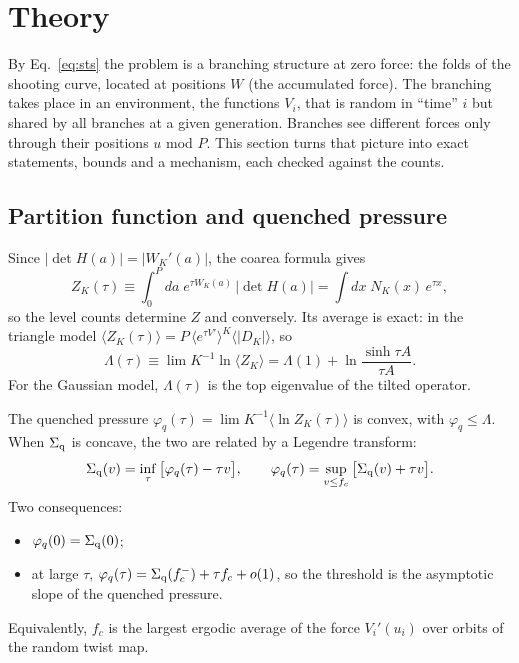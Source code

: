 \documentclass[10pt,a4paper]{article}
\newcommand{\Sq}{\Sigma_{\rm q}}
\begin{document}
\section{Theory}\label{sec:theory}

By Eq.~\eqref{eq:sts} the problem is a branching structure at zero force: the folds of the shooting curve, located at positions $W$ (the accumulated force).
The branching takes place in an environment, the functions $V_i$, that is random in ``time'' $i$ but shared by all branches at a given generation.
Branches see different forces only through their positions $u$ mod $P$.
This section turns that picture into exact statements, bounds and a mechanism, each checked against the counts.

\subsection{Partition function and quenched pressure}

Since $|\det H(a)|=|W_K'(a)|$, the coarea formula gives
\begin{equation}
Z_K(\tau)\equiv\int_0^P\!da\;e^{\tau W_K(a)}\,|\det H(a)|=\int\!dx\;N_K(x)\,e^{\tau x},
\label{eq:Z}
\end{equation}
so the level counts determine $Z$ and conversely.
Its average is exact: in the triangle model $\langle Z_K(\tau)\rangle=P\,\langle e^{\tau V'}\rangle^K\langle|D_K|\rangle$, so
\[
\Lambda(\tau)\equiv\lim K^{-1}\ln\langle Z_K\rangle=\Lambda(1)+\ln\frac{\sinh\tau A}{\tau A}.
\]
For the Gaussian model, $\Lambda(\tau)$ is the top eigenvalue of the tilted operator.

The quenched pressure $\varphi_q(\tau)=\lim K^{-1}\langle\ln Z_K(\tau)\rangle$ is convex, with $\varphi_q\le\Lambda$.
When $\Sq$ is concave, the two are related by a Legendre transform:
\begin{equation}
\Sq(v)=\inf_\tau\big[\varphi_q(\tau)-\tau v\big],\qquad
\varphi_q(\tau)=\sup_{v\le f_c}\big[\Sq(v)+\tau v\big].
\label{eq:legendre}
\end{equation}
Two consequences:
\begin{itemize}
\item $\varphi_q(0)=\Sq(0)$;
\item at large $\tau$, $\varphi_q(\tau)=\Sq(f_c^-)+\tau f_c+o(1)$, so the threshold is the asymptotic slope of the quenched pressure.
\end{itemize}
Equivalently, $f_c$ is the largest ergodic average of the force $V_i'(u_i)$ over orbits of the random twist map.
\end{document}
